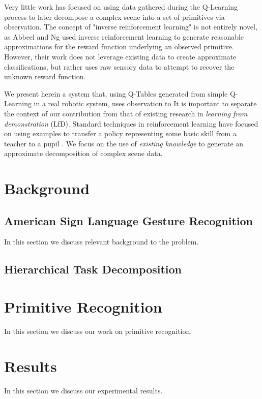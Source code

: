 \documentclass[letterpaper]{article}
\begin{document}
Very little work has focused on using data gathered during the Q-Learning
process to later decompose a complex scene into a set of primitives via
observation.  The concept of "inverse reinforcement learning" is not entirely
novel, as Abbeel and Ng \cite{InverseRL} used inverse reinforcement learning
to generate reasonable approximations for the reward function underlying an
observed primitive.  However, their work does not leverage existing data
to create approximate classifications, but rather uses raw sensory data to
attempt to recover the unknown reward function.

We present herein a system that, using Q-Tables generated from simple
Q-Learning in a real robotic system, uses observation to 
It is important to separate the context of our contribution from that of
existing research in \textit{learning from demonstration} (LfD).  Standard
techniques in reinforcement learning have focused on using examples to
transfer a policy representing some basic skill from a teacher to a
pupil \cite{JenkinsLFD,LFDSurvey}.  We focus on the use of
\textit{existing knowledge} to generate an approximate decomposition of
complex scene data.

\section{Background}
\label{sec:background}
\subsection{American Sign Language Gesture Recognition}
In this section we discuss relevant background to the problem.

\subsection{Hierarchical Task Decomposition}

\section{Primitive Recognition}
\label{sec:recognition}
In this section we discuss our work on primitive recognition.

\section{Results}
\label{sec:result}
In this section we discuss our experimental results.
\end{document}
